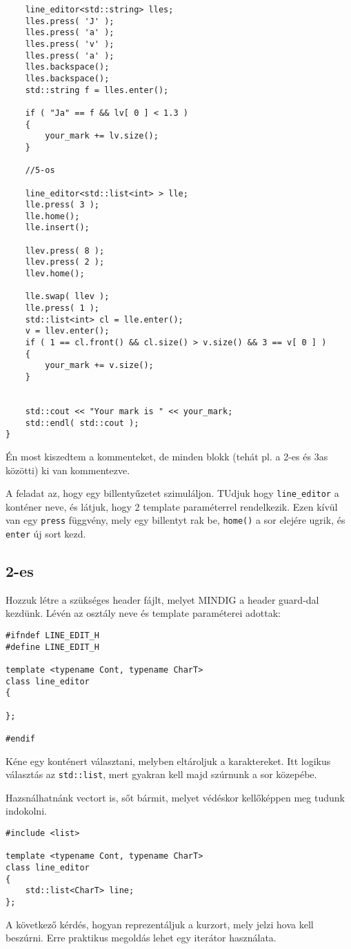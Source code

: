 \documentclass[a4paper,11.5pt]{article}
\begin{document}
\begin{lstlisting}
	line_editor<std::string> lles;
	lles.press( 'J' );
	lles.press( 'a' );
	lles.press( 'v' );
	lles.press( 'a' );
	lles.backspace();
	lles.backspace();
	std::string f = lles.enter();
	
	if ( "Ja" == f && lv[ 0 ] < 1.3 )
	{
		your_mark += lv.size();
	}
	
	//5-os
	
	line_editor<std::list<int> > lle;
	lle.press( 3 );
	lle.home();
	lle.insert();
	
	llev.press( 8 );
	llev.press( 2 );
	llev.home();
	
	lle.swap( llev );
	lle.press( 1 );
	std::list<int> cl = lle.enter();
	v = llev.enter();
	if ( 1 == cl.front() && cl.size() > v.size() && 3 == v[ 0 ] )
	{
		your_mark += v.size();
	}
	
	
	std::cout << "Your mark is " << your_mark;
	std::endl( std::cout );
}
\end{lstlisting}

	Én most kiszedtem a kommenteket, de minden blokk (tehát pl. a 2-es és 3as közötti) ki van kommentezve.
	
	A feladat az, hogy egy billentyűzetet szimuláljon. TUdjuk hogy \texttt{line\_editor} a konténer neve, és látjuk, hogy 2 template paraméterrel rendelkezik. Ezen kívül van egy \texttt{press} függvény, mely egy billentyt rak be, \texttt{home()} a sor elejére ugrik, és \texttt{enter} új sort kezd.
	\subsection{2-es}
	Hozzuk létre a szükséges header fájlt, melyet MINDIG a header guard-dal kezdünk. Lévén az osztály neve és template paraméterei adottak:
	\begin{lstlisting}
#ifndef LINE_EDIT_H
#define LINE_EDIT_H

template <typename Cont, typename CharT>
class line_editor
{

};

#endif 
	\end{lstlisting}
	Kéne egy konténert választani, melyben eltároljuk a karaktereket. Itt logikus választás az \texttt{std::list}, mert gyakran kell majd szúrnunk a sor közepébe.
	\begin{note}
		Hazsnálhatnánk vectort is, sőt bármit, melyet védéskor kellőképpen meg tudunk indokolni.
	\end{note}
\begin{lstlisting}
#include <list>

template <typename Cont, typename CharT>
class line_editor
{
	std::list<CharT> line;
};
\end{lstlisting}
	A következő kérdés, hogyan reprezentáljuk a kurzort, mely jelzi hova kell beszúrni. Erre praktikus megoldás lehet egy iterátor használata.
\end{document}

